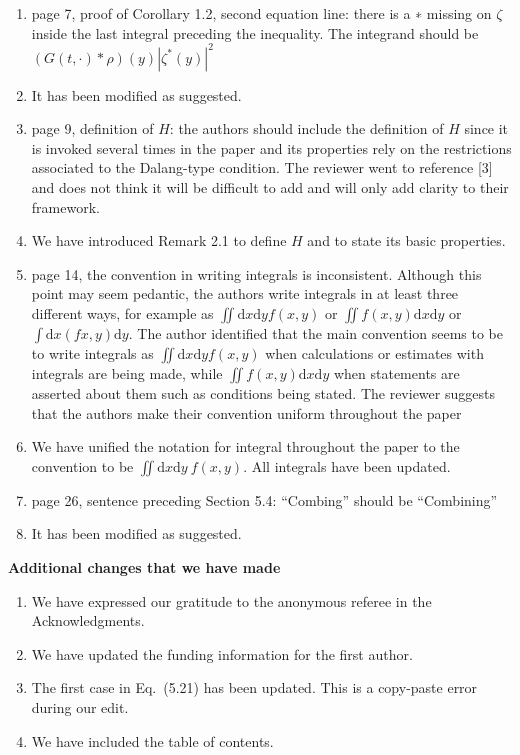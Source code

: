 \documentclass[12pt]{article} %
\theoremstyle{plain}
\theoremstyle{definition}
\numberwithin{equation}{section}
\newcommand{\ud}{\ensuremath{ \mathrm{d}} }
\begin{document}
\begin{enumerate}[(1)]
  \item[3.] page 7, proof of Corollary 1.2, second equation line: there is a ∗
    missing on $\zeta$ inside the last integral preceding the inequality. The
    integrand should be $(G(t,\cdot)*\rho)(y) |\zeta^*(y)|^2$
  \item[A:] It has been modified as suggested.

  \item[4.] page 9, definition of $H$: the authors should include the
    definition of $H$ since it is invoked several times in the paper and its
    properties rely on the restrictions associated to the Dalang-type condition.
    The reviewer went to reference [3] and does not think it will be difficult
    to add and will only add clarity to their framework.
  \item[A:] We have introduced Remark 2.1 to define $H$ and to state its basic
    properties.

  \item[5.] page 14, the convention in writing integrals is inconsistent.
    Although this point may seem pedantic, the authors write integrals in at
    least three different ways, for example as $\iint \ud x\ud y f (x, y) $ or
    $\iint f (x, y)\ud x\ud y$ or $\int\ud x (f x, y)\ud y$. The author
    identified that the main convention seems to be to write integrals as
    $\iint\ud x\ud y f(x,y)$ when calculations or estimates with integrals are
    being made, while $\iint f (x, y)\ud x\ud y$ when statements are asserted
    about them such as conditions being stated. The reviewer suggests that the
    authors make their convention uniform throughout the paper
  \item[A:] We have unified the notation for integral throughout the paper to
    the convention to be $\iint \ud x\ud y \: f(x,y)$. All integrals have been
    updated.

  \item[6.] page 26, sentence preceding Section 5.4: “Combing” should be
    “Combining”
  \item[A:] It has been modified as suggested.

\end{enumerate}

\bigskip\noindent\textbf{Additional changes that we have made}

\begin{enumerate}
  \item We have expressed our gratitude to the anonymous referee in the
    Acknowledgments.
  \item We have updated the funding information for the first author.
  \item The first case in Eq.~(5.21) has been updated. This is a copy-paste
    error during our edit.
  \item We have included the table of contents.
\end{enumerate}



\end{document}
